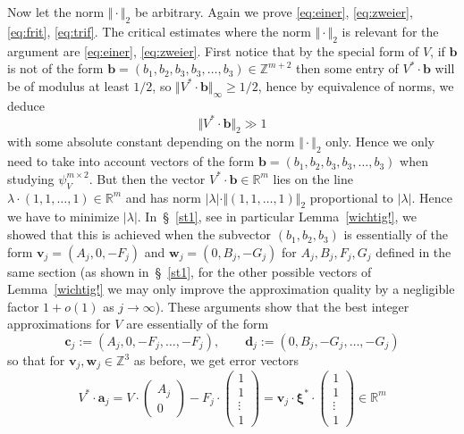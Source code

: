 \documentclass[10pt]{amsart}
\theoremstyle{definition}
\newcommand{\w}{\boldsymbol{w}}
\newcommand{\vv}{\boldsymbol{v}}
\newcommand{\uxs}{\boldsymbol{\xi}^{\ast}}
\newcommand{\bb}{\boldsymbol{b}}
\newcommand{\R}{\mathbb{R}}
\newcommand{\Z}{\mathbb{Z}}
\begin{document}
Now let the norm $\Vert\cdot\Vert_2$ be arbitrary. 
Again we prove \eqref{eq:einer}, \eqref{eq:zweier}, \eqref{eq:frit}, \eqref{eq:trif}. The critical estimates where the norm $\Vert\cdot\Vert_2$ is relevant for the argument are \eqref{eq:einer}, \eqref{eq:zweier}.
First notice that by the special form of $V$, if $\bb$ is not of the form 
$\bb=(b_1,b_2,b_3,b_3,\ldots,b_3)\in \Z^{m+2}$ 
then some entry of $V^{\ast}\cdot \bb$ will be of modulus at least $1/2$, 
so $\Vert V^{\ast}\cdot \bb\Vert_{\infty}\ge 1/2$,
hence by equivalence of norms, we deduce 
\[
\Vert V^{\ast}\cdot \bb\Vert_2 \gg 1
\]
with some absolute constant depending on the norm $\Vert\cdot\Vert_2$ only.
Hence we only need to take into account vectors of the form $\bb=(b_1,b_2,b_3,b_3,\ldots,b_3)$ when studying $\psi_{V}^{m\times 2}$. But then the 
vector $V^{\ast}\cdot \bb\in \R^m$ lies on the line $\lambda\cdot (1,1,\ldots,1)\in \R^m$ and has norm $|\lambda|\cdot \Vert (1,1,\ldots,1)\Vert_2$ proportional to $|\lambda|$. Hence
we have to minimize $|\lambda|$. In~\S~\ref{st1}, see in particular Lemma~\ref{wichtig!}, we showed that this is achieved when the subvector $(b_1,b_2,b_3)$ is essentially 
of the form $\vv_j=(A_j,0,-F_j)$ and $\w_j=(0,B_j,-G_j)$ for $A_j, B_j, F_j, G_j$ defined in the same section (as shown in~\S~\ref{st1}, for the other possible vectors of Lemma~\ref{wichtig!} we may only improve the approximation quality by a negligible factor $1+o(1)$
as $j\to\infty$). These arguments show that the best integer approximations for $V$ are essentially of the form
\begin{equation} \label{eq:vecin}
\boldsymbol{c}_j:= (A_j, 0 , -F_j, \ldots , -F_j ), \qquad \boldsymbol{d}_j:= (0, B_j , -G_j, \ldots , -G_j )
\end{equation}
so that for $\vv_j, \w_j\in\Z^3$ as before, we get error vectors
\[
V^{\ast}\cdot \boldsymbol{a}_j=  V\cdot \begin{pmatrix}
A_j \\ 0
\end{pmatrix}
- F_j\cdot \begin{pmatrix}
1 \\ 1 \\ \vdots \\ 1
\end{pmatrix}=\vv_j\cdot \uxs\cdot \begin{pmatrix}
1 \\ 1 \\ \vdots \\ 1
\end{pmatrix}\in \R^m
\]
\end{document}
